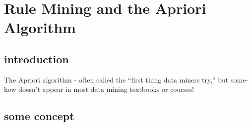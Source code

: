 \chapter{Rule Mining and the Apriori Algorithm}
\section{introduction}
The Apriori algorithm - often called the “first thing data miners try,” but some- how doesn’t appear in most data mining textbooks or courses!
\section{some concept}


